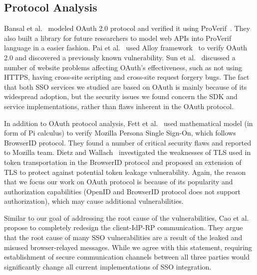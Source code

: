 \subsection{Protocol Analysis}
Bansal et al.~\cite{6266164} modeled OAuth 2.0 protocol and verified it using ProVerif~\cite{Blanchet:2001:ECP:872752.873511}.  They also built a library for future researchers to model web APIs into ProVerif language in a easier fashion.  Pai et al.~\cite{5966531} used Alloy framework~\cite{Alloy} to verify OAuth 2.0 and discovered a previously known vulnerability.  Sun et al.~\cite{Sun:2012:DDE:2382196.2382238} discussed a number of website problems affecting OAuth's effectiveness, such as not using HTTPS, having cross-site scripting and cross-site request forgery bugs.  The fact that both SSO services we studied are based on OAuth is mainly because of its widespread adoption, but the security issues we found concern the SDK and service implementations, rather than flaws inherent in the OAuth protocol.  

\renewcommand{\thefootnote}{$\star$} 

In addition to OAuth protocol analysis, Fett et al.\footnotemark[1]~\cite{Fett:2014:EMW:2650286.2650776} used mathematical model (in form of Pi calculus) to verify Mozilla Persona Single Sign-On, which follows BrowserID protocol.  They found a number of critical security flaws and reported to Mozilla team.  Dietz and Wallach~\cite{dietz2014hardening} investigated the weaknesses of TLS used in token transportation in the BrowserID protocol and proposed an extension of TLS to protect against potential token leakage vulnerability.  Again, the reason that we focus our work on OAuth protocol is because of its popularity and authorization capabilities (OpenID and BrowserID protocol does not support authorization), which may cause additional vulnerabilities.

Similar to our goal of addressing the root cause of the vulnerabilities, Cao et al.\footnotemark[1]~\cite{Cao14} propose to completely redesign the client-IdP-RP communication.  They argue that the root cause of many SSO vulnerabilities are a result of the leaked and misused browser-relayed messages.  While we agree with this statement, requiring establishment of secure communication channels between all three parties would significantly change all current implementations of SSO integration.


\renewcommand{\thefootnote}{\arabic{footnote}}

